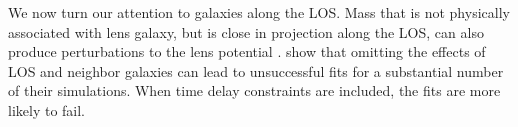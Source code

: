 We now turn our attention to galaxies along the LOS. Mass that is not physically associated with lens galaxy, but is close in projection along the LOS, can also produce perturbations to the lens potential \citep[e.g.,][]{Bar-Kana96,Momcheva06, Wong11}. 
\citet{Jaroszynski14} show that omitting the effects of LOS and neighbor galaxies can lead to unsuccessful fits for a substantial number of their simulations. When time delay constraints are included, the fits are more likely to fail.